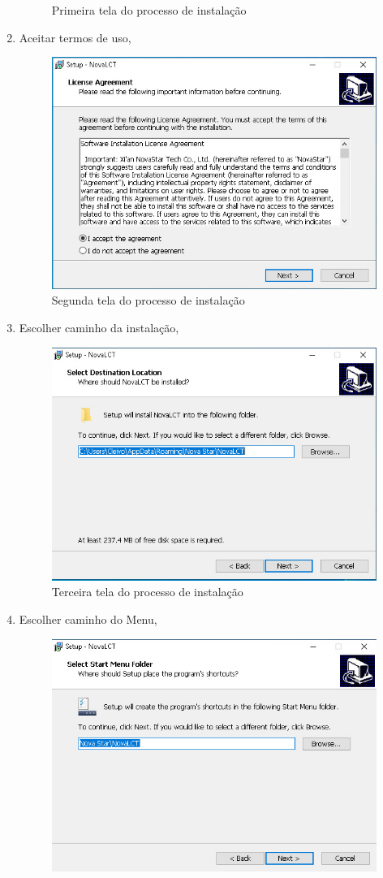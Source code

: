 \documentclass[12pt, a4paper]{article}
\begin{document}
\begin{enumerate}
\begin{figure}[!htb]
			\caption{\label{fig:D1.jpeg}Primeira tela do processo de instalação}
		\end{figure}
		\newpage
	\item Aceitar termos de uso,
		\begin{figure}[!htb]
			\centering
			\includegraphics[width=.8\textwidth]{D2.jpeg}
			\caption{\label{fig:D2.jpeg}Segunda tela do processo de instalação}
		\end{figure}
	\item Escolher caminho da instalação,
		\begin{figure}[!htb]
			\centering
			\includegraphics[width=.8\textwidth]{D3.jpeg}
			\caption{Terceira tela do processo de instalação}
		\end{figure}
		\newpage
	\item Escolher caminho do Menu,
		\begin{figure}[!htb]
			\centering
			\includegraphics[width=.8\textwidth]{D4.jpeg}

\end{figure}
\end{enumerate}
\end{document}
